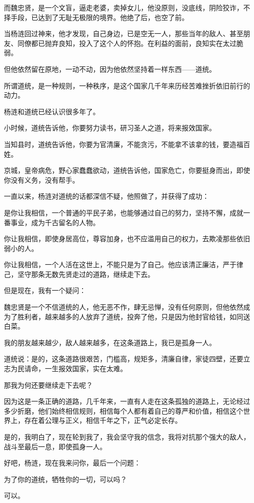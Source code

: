 \begin{multicols}{\theparacolNo}
		而魏忠贤，是一个文盲，逼走老婆，卖掉女儿，他没原则，没底线，阴险狡诈，不择手段，已达到了无耻无极限的境界。他绝了后，也空了前。

		当杨涟回过神来，他才发现，自己身边，已是空无一人，那些当年的敌人、甚至朋友、同僚都已抛弃良知，投入了这个人的怀抱。在利益的面前，良知实在太过脆弱。

		但他依然留在原地，一动不动，因为他依然坚持着一样东西——道统。

		所谓道统，是一种规则，一种秩序，是这个国家几千年来历经苦难挫折依旧前行的动力。

		杨涟和道统已经认识很多年了。

		小时候，道统告诉他，你要努力读书，研习圣人之道，将来报效国家。

		当知县时，道统告诉他，你要为官清廉，不能贪污，不能拿不该拿的钱，要造福百姓。

		京城，皇帝病危，野心家蠢蠢欲动，道统告诉他，国家危亡，你要挺身而出，即使你没有义务，没有帮手。

		一直以来，杨涟对道统的话都深信不疑，他照做了，并获得了成功：

		是你让我相信，一个普通的平民子弟，也能够通过自己的努力，坚持不懈，成就一番事业，成为千古留名的人物。

		你让我相信，即使身居高位，尊容加身，也不应滥用自己的权力，去欺凌那些依旧弱小的人。

		你让我相信，一个人活在这世上，不能只是为了自己。他应该清正廉洁，严于律己，坚守那条无数先贤走过的道路，继续走下去。

		但是现在，我有一个疑问：

		魏忠贤是一个不信道统的人，他无恶不作，肆无忌惮，没有任何原则，但他依然成为了胜利者，越来越多的人放弃了道统，投奔了他，只是因为他封官给钱，如同送白菜。

		我的朋友越来越少，敌人越来越多，在这条道路上，我已是孤身一人。

		道统说：是的，这条道路很艰苦，门槛高，规矩多，清廉自律，家徒四壁，还要立志为民请命，一生报效国家，实在太难。

		那我为何还要继续走下去呢？

		因为这是一条正确的道路，几千年来，一直有人走在这条孤独的道路上，无论经过多少折磨，他们始终相信规则，相信每个人都有着自己的尊严和价值，相信这个世界上，存在着公理与正义，相信千年之下，正气必定长存。

		是的，我明白了，现在轮到我了，我会坚守我的信念，我将对抗那个强大的敌人，战斗至最后一息，即使孤身一人。

		好吧，杨涟，现在我来问你，最后一个问题：

		为了你的道统，牺牲你的一切，可以吗？

		可以。

		\ifnum{}
	\end{multicols}
\fi
\newpage
